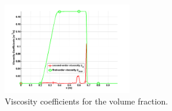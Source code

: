 \documentclass{anstrans}
\begin{document}
\begin{figure}[H]				
                \centering
                \includegraphics[width=0.495\textwidth]{plots/relaxation_two_phases_liquid_beta.png}
                \caption{Viscosity coefficients for the volume fraction.}
                \label{fig:viscosity_coeff_beta}
\end{figure}
%





\end{document}
